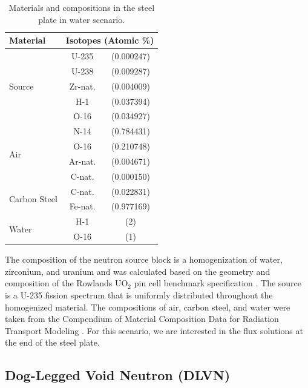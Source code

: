 \documentclass{article} %
\begin{document}
\begin{table}[!htb]
\centering
\caption{Materials and compositions in the steel plate in water scenario.}
\label{steel-mat}
\begin{tabular}{l|cc}
\textbf{Material} & \multicolumn{2}{c}{\textbf{Isotopes (Atomic \%)}} \\ \hline
\multirow{5}{*}{Source}   & U-235   & (0.000247) \\
                          & U-238   & (0.009287) \\
                          & Zr-nat. & (0.004009) \\
                          & H-1     & (0.037394) \\
                          & O-16    & (0.034927) \\ \hline
\multirow{4}{*}{Air}      & N-14    & (0.784431) \\
                          & O-16    & (0.210748) \\
                          & Ar-nat. & (0.004671) \\
                          & C-nat.  & (0.000150) \\ \hline
\multirow{2}{*}{Carbon Steel} & C-nat.  & (0.022831) \\
                              & Fe-nat. & (0.977169) \\ \hline
\multirow{2}{*}{Water}        & H-1     & (2)        \\
                              & O-16    & (1)        \\
\end{tabular}
\end{table}

The composition of the neutron source block is a homogenization of water,
zirconium, and uranium and was calculated based on the geometry and
composition of the Rowlands UO$_2$ pin cell benchmark specification
\cite{pincell}. The source is a U-235 fission  spectrum that is uniformly
distributed throughout the homogenized material. The compositions of air,
carbon steel, and water were taken from the Compendium of  Material
Composition Data for Radiation Transport Modeling \cite{pnnl}. For this
scenario, we are interested in the flux solutions at the end of the steel
plate.

\subsection{Dog-Legged Void Neutron (DLVN)}
\end{document}
